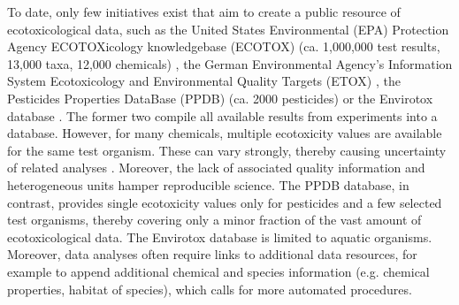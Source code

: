 \documentclass[journal,datadescriptor,submit,moreauthors,pdftex]{Definitions/mdpi}
\begin{document}
To date, only few initiatives exist that aim to create a public resource of ecotoxicological data, such as the United States Environmental (EPA) Protection Agency ECOTOXicology knowledgebase (ECOTOX) (ca. 1,000,000 test results, 13,000 taxa, 12,000 chemicals) \citep{elonen_ecotoxicology_2018}, the German Environmental Agency's Information System Ecotoxicology and Environmental Quality Targets (ETOX) \citep{umweltbundesamt_etox_2019}, the Pesticides Properties DataBase (PPDB) (ca. 2000 pesticides) \citep{lewis_international_2016} or the Envirotox database \citep{healthandenvironmentalsciencesinstitutehesi_envirotox_2019, connors_creation_2019}. The former two compile all available results from experiments into a database. However, for many chemicals, multiple ecotoxicity values are available for the same test organism. These  can vary strongly, thereby causing uncertainty of related analyses \citep{mark_analysis_1998, malaj_physiological_2012}. Moreover, the lack of associated quality information and heterogeneous units hamper reproducible science. The PPDB database, in contrast, provides single ecotoxicity values only for pesticides and a few selected test organisms, thereby covering only a minor fraction of the vast amount of ecotoxicological data. The Envirotox database is limited to aquatic organisms. Moreover, data analyses often require links to additional data resources, for example to append additional chemical and species information (e.g. chemical properties, habitat of species), which calls for more automated procedures. 
\end{document}
